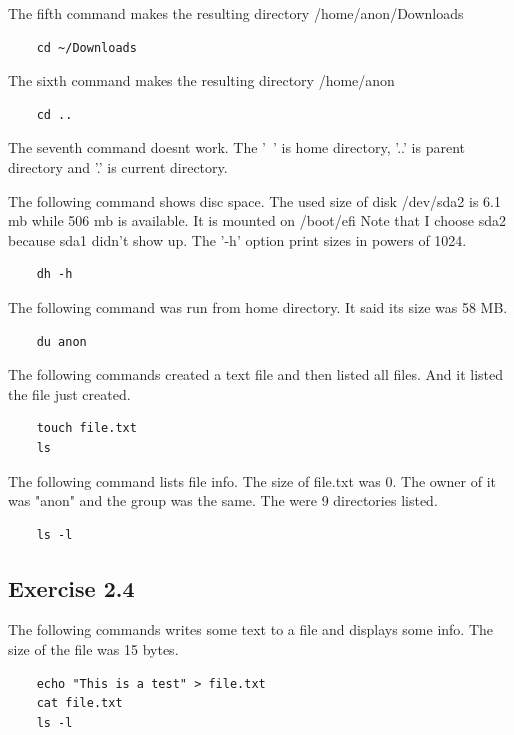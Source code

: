 \documentclass{article}
\begin{document}
The fifth command makes the resulting directory /home/anon/Downloads
\begin{verbatim}
	cd ~/Downloads
\end{verbatim}

The sixth command makes the resulting directory /home/anon
\begin{verbatim}
	cd ..
\end{verbatim}

The seventh command doesnt work.
The '~' is home directory, '..' is parent directory and '.' is current directory.

The following command shows disc space. The used size of disk /dev/sda2 is 6.1 mb while 506 mb is available.
It is mounted on /boot/efi
Note that I choose sda2 because sda1 didn't show up.
The '-h' option print sizes in powers of 1024.

\begin{verbatim}
	dh -h
\end{verbatim}

The following command was run from home directory. It said its size was 58 MB.

\begin{verbatim}
	du anon
\end{verbatim}

The following commands created a text file and then listed all files. And it listed the file just created.

\begin{verbatim}
	touch file.txt 
	ls
\end{verbatim}

The following command lists file info. The size of file.txt was 0.
The owner of it was "anon" and the group was the same. The were 9 directories listed.

\begin{verbatim}
	ls -l
\end{verbatim}

\subsection{Exercise 2.4}

The following commands writes some text to a file and displays some info.
The size of the file was 15 bytes.

\begin{verbatim}
	echo "This is a test" > file.txt 
	cat file.txt
	ls -l
\end{verbatim}
\end{document}
